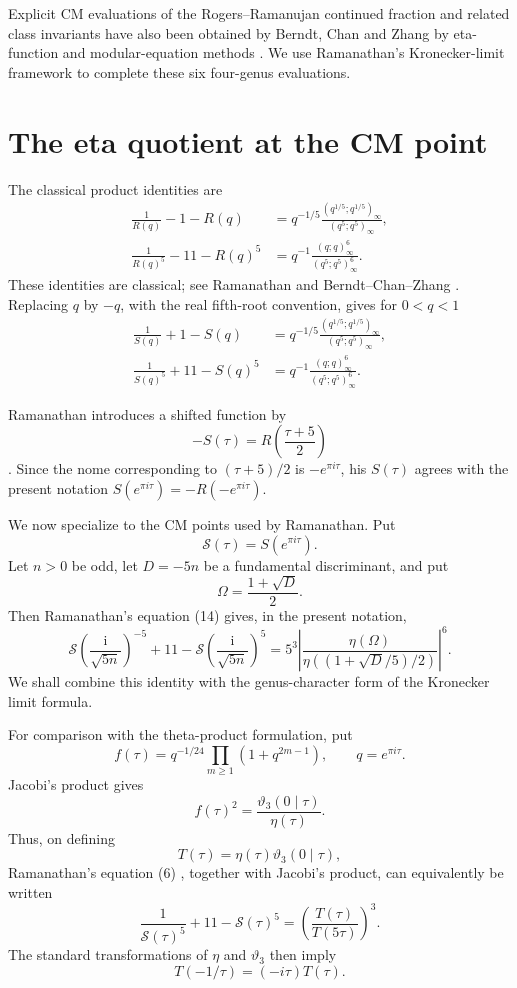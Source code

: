 \documentclass[11pt,a4paper]{article}
\newcommand{\ii}{\mathrm i}
\begin{document}
Explicit CM evaluations of the Rogers--Ramanujan continued fraction and related class invariants have also been obtained by Berndt, Chan and Zhang by eta-function and modular-equation methods \cite{BCZ1996,BCZ1997}.  We use Ramanathan's Kronecker-limit framework to complete these six four-genus evaluations.

\section{The eta quotient at the CM point}
The classical product identities are
\begin{align}
\frac1{R(q)}-1-R(q)
 &=q^{-1/5}\frac{(q^{1/5};q^{1/5})_\infty}{(q^5;q^5)_\infty},\label{eq:R1}\\
\frac1{R(q)^5}-11-R(q)^5
 &=q^{-1}\frac{(q;q)_\infty^6}{(q^5;q^5)_\infty^6}.\label{eq:R5}
\end{align}
These identities are classical; see Ramanathan \cite{Ramanathan1984} and Berndt--Chan--Zhang \cite{BCZ1996}.  Replacing $q$ by $-q$, with the real fifth-root convention, gives for $0<q<1$
\begin{align}
\frac1{S(q)}+1-S(q)
 &=q^{-1/5}\frac{(q^{1/5};q^{1/5})_\infty}{(q^5;q^5)_\infty},\label{eq:S1}\\
\frac1{S(q)^5}+11-S(q)^5
 &=q^{-1}\frac{(q;q)_\infty^6}{(q^5;q^5)_\infty^6}.\label{eq:S5}
\end{align}

Ramanathan introduces a shifted function by
\[
-S(\tau)=R\!\left(\frac{\tau+5}{2}\right)
\]
\cite[p.~68]{Ramanathan1984}.  Since the nome corresponding to $(\tau+5)/2$ is
$-e^{\pi i\tau}$, his $S(\tau)$ agrees with the present notation
$S(e^{\pi i\tau})=-R(-e^{\pi i\tau})$.

We now specialize to the CM points used by Ramanathan.  Put
\[
\mathcal S(\tau)=S(e^{\pi i\tau}).
\]
Let $n>0$ be odd, let $D=-5n$ be a fundamental discriminant, and put
\[
\Omega=\frac{1+\sqrt D}{2}.
\]
Then Ramanathan's equation (14) \cite[p.~70]{Ramanathan1984} gives, in the present notation,
\begin{equation}
\mathcal S\!\left(\frac{\ii}{\sqrt{5n}}\right)^{-5}+11-
\mathcal S\!\left(\frac{\ii}{\sqrt{5n}}\right)^5
=5^3\left|\frac{\eta(\Omega)}
{\eta((1+\sqrt D/5)/2)}\right|^6.
\label{eq:Ramanathan14}
\end{equation}
We shall combine this identity with the genus-character form of the Kronecker limit formula.

For comparison with the theta-product formulation, put
\[
f(\tau)=q^{-1/24}\prod_{m\ge1}(1+q^{2m-1}),
\qquad q=e^{\pi i\tau}.
\]
Jacobi's product gives
\[
f(\tau)^2=\frac{\vartheta_3(0\mid\tau)}{\eta(\tau)}.
\]
Thus, on defining
\[
T(\tau)=\eta(\tau)\vartheta_3(0\mid\tau),
\]
Ramanathan's equation (6) \cite[p.~68]{Ramanathan1984}, together with Jacobi's product, can equivalently be written
\begin{equation}
\frac1{\mathcal S(\tau)^5}+11-\mathcal S(\tau)^5
=\left(\frac{T(\tau)}{T(5\tau)}\right)^3.
\label{eq:Tidentity}
\end{equation}
The standard transformations of $\eta$ and $\vartheta_3$ then imply
\[
T(-1/\tau)=(-i\tau)T(\tau).
\]
\end{document}

